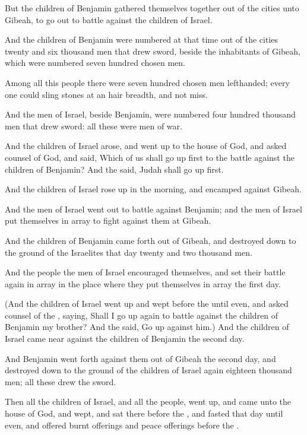 \verse But the children of Benjamin gathered themselves together out of the cities unto Gibeah, to go out to battle against the children of Israel.

\verse And the children of Benjamin were numbered at that time out of the cities twenty and six thousand men that drew sword, beside the inhabitants of Gibeah, which were numbered seven hundred chosen men.

\verse Among all this people there were seven hundred chosen men lefthanded; every one could sling stones at an hair breadth, and not miss.

\verse And the men of Israel, beside Benjamin, were numbered four hundred thousand men that drew sword: all these were men of war.

\verse And the children of Israel arose, and went up to the house of God, and asked counsel of God, and said, Which of us shall go up first to the battle against the children of Benjamin? And the \LORD said, Judah shall go up first.

\verse And the children of Israel rose up in the morning, and encamped against Gibeah.

\verse And the men of Israel went out to battle against Benjamin; and the men of Israel put themselves in array to fight against them at Gibeah.

\verse And the children of Benjamin came forth out of Gibeah, and destroyed down to the ground of the Israelites that day twenty and two thousand men.

\verse And the people the men of Israel encouraged themselves, and set their battle again in array in the place where they put themselves in array the first day.

\verse (And the children of Israel went up and wept before the \LORD until even, and asked counsel of the \LORD, saying, Shall I go up again to battle against the children of Benjamin my brother? And the \LORD said, Go up against him.)  \verse And the children of Israel came near against the children of Benjamin the second day.

\verse And Benjamin went forth against them out of Gibeah the second day, and destroyed down to the ground of the children of Israel again eighteen thousand men; all these drew the sword.

\verse Then all the children of Israel, and all the people, went up, and came unto the house of God, and wept, and sat there before the \LORD, and fasted that day until even, and offered burnt offerings and peace offerings before the \LORD.


